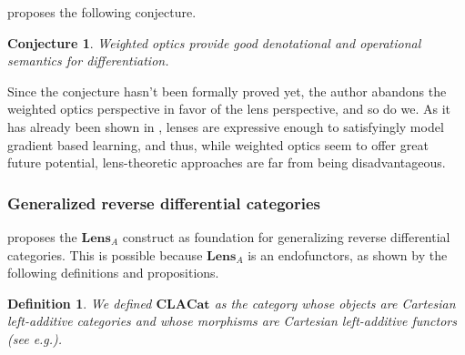 \documentclass[12pt,a4paper,openright,twoside]{report}
\theoremstyle{plain}
\newtheorem{definition}[proposition]{Definition}
\newtheorem{conjecture}[proposition]{Conjecture}
\theoremstyle{definition}
\begin{document}
\cite{gavranovic2024fundamental} proposes the following conjecture.

\begin{conjecture}
  Weighted optics provide good denotational and operational semantics for differentiation.
\end{conjecture}

Since the conjecture hasn't been formally proved yet, the author abandons the weighted optics perspective in favor of the lens perspective, and so do we. As it has already been shown in \cite{cruttwell2022categorical}, lenses are expressive enough to satisfyingly model gradient based learning, and thus, while weighted optics seem to offer great future potential, lens-theoretic approaches are far from being disadvantageous.


\subsubsection{}





\subsubsection{Generalized reverse differential categories}

\cite{gavranovic2024fundamental} proposes the $\mathbf{Lens}_A$ construct as foundation for generalizing reverse differential categories. This is possible because $\mathbf{Lens}_A$ is an endofunctors, as shown by the following definitions and propositions.

\begin{definition}
  We defined $\mathbf{CLACat}$ as the category whose objects are Cartesian left-additive categories and whose morphisms are Cartesian left-additive functors (see e.g.\cite{blute2006differential}).
\end{definition}
\end{document}
